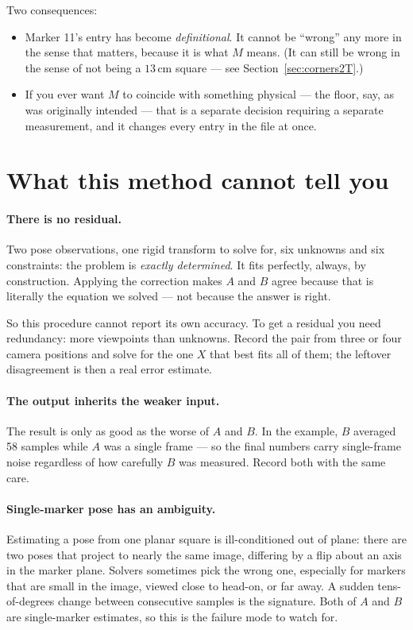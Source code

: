 \documentclass[11pt,a4paper]{article}
\begin{document}
Two consequences:
\begin{itemize}[leftmargin=*,itemsep=1pt]
\item Marker 11's entry has become \emph{definitional}. It cannot be ``wrong'' any more
      in the sense that matters, because it is what $M$ means. (It can still be wrong in
      the sense of not being a $13\,$cm square --- see Section~\ref{sec:corners2T}.)
\item If you ever want $M$ to coincide with something physical --- the floor, say, as was
      originally intended --- that is a separate decision requiring a separate
      measurement, and it changes every entry in the file at once.
\end{itemize}

\section{What this method cannot tell you}

\paragraph{There is no residual.} Two pose observations, one rigid transform to solve
for, six unknowns and six constraints: the problem is \emph{exactly determined}. It fits
perfectly, always, by construction. Applying the correction makes $A$ and $B$ agree
because that is literally the equation we solved --- not because the answer is right.

So this procedure cannot report its own accuracy. To get a residual you need redundancy:
more viewpoints than unknowns. Record the pair from three or four camera positions and
solve for the one $X$ that best fits all of them; the leftover disagreement is then a
real error estimate.

\paragraph{The output inherits the weaker input.} The result is only as good as the worse
of $A$ and $B$. In the example, $B$ averaged 58 samples while $A$ was a single frame ---
so the final numbers carry single-frame noise regardless of how carefully $B$ was
measured. Record both with the same care.

\paragraph{Single-marker pose has an ambiguity.} Estimating a pose from one planar square
is ill-conditioned out of plane: there are two poses that project to nearly the same
image, differing by a flip about an axis in the marker plane. Solvers sometimes pick the
wrong one, especially for markers that are small in the image, viewed close to
head-on, or far away. A sudden tens-of-degrees change between consecutive samples is the
signature. Both of $A$ and $B$ are single-marker estimates, so this is the failure mode
to watch for.
\end{document}
